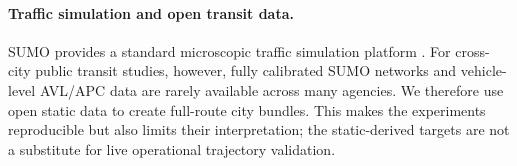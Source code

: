 \paragraph{Traffic simulation and open transit data.}
SUMO provides a standard microscopic traffic simulation platform \citep{lopez2018microscopic}.
For cross-city public transit studies, however, fully calibrated SUMO networks and vehicle-level AVL/APC data are rarely available across many agencies.
We therefore use open static data to create full-route city bundles.
This makes the experiments reproducible but also limits their interpretation; the static-derived targets are not a substitute for live operational trajectory validation.
